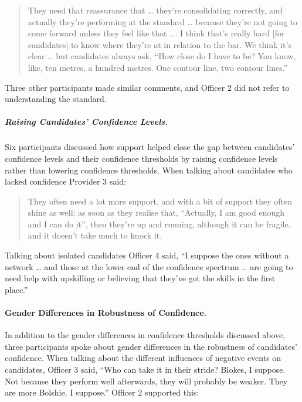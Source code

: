 \documentclass[
  12pt,
  a4paper,
]{book}
\begin{document}
\begin{quote}
They need that reassurance that \ldots{} they're consolidating correctly, and actually they're performing at the standard \ldots{} because they're not going to come forward unless they feel like that \ldots. I think that's really hard {[}for candidates{]} to know where they're at in relation to the bar. We think it's clear \ldots{} but candidates always ask, ``How close do I have to be? You know, like, ten metres, a hundred metres. One contour line, two contour lines.''
\end{quote}

Three other participants made similar comments, and Officer 2 did not refer to understanding the standard.

\hypertarget{raising-candidates-confidence-levels.}{%
\subparagraph{Raising Candidates' Confidence Levels.}\label{raising-candidates-confidence-levels.}}

Six participants discussed how support helped close the gap between candidates' confidence levels and their confidence thresholds by raising confidence levels rather than lowering confidence thresholds. When talking about candidates who lacked confidence Provider 3 said:

\begin{quote}
They often need a lot more support, and with a bit of support they often shine as well: as soon as they realise that, ``Actually, I am good enough and I can do it'', then they're up and running, although it can be fragile, and it doesn't take much to knock it.
\end{quote}

Talking about isolated candidates Officer 4 said, ``I suppose the ones without a network \ldots{} and those at the lower end of the confidence spectrum \ldots{} are going to need help with upskilling or believing that they've got the skills in the first place.''

\hypertarget{gender-differences-in-robustness-of-confidence.}{%
\paragraph{Gender Differences in Robustness of Confidence.}\label{gender-differences-in-robustness-of-confidence.}}

In addition to the gender differences in confidence thresholds discussed above, three participants spoke about gender differences in the robustness of candidates' confidence. When talking about the different influences of negative events on candidates, Officer 3 said, ``Who can take it in their stride? Blokes, I suppose. Not because they perform well afterwards, they will probably be weaker. They are more Bolshie, I suppose.'' Officer 2 supported this:
\end{document}
